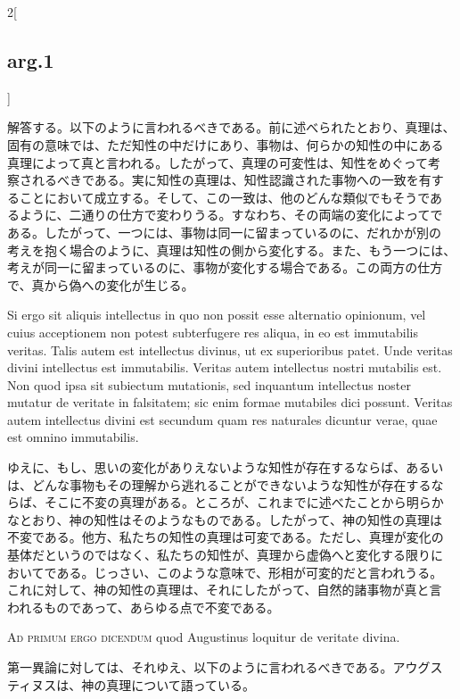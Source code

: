 \documentclass[paper=a4paper,fontsize=10pt,jafontsize=9pt,titlepage]{jlreq}
\begin{document}
\begin{paracol}{2}[\subsection{arg.1}]
\switchcolumn

解答する。以下のように言われるべきである。前に述べられたとおり、真理は、
固有の意味では、ただ知性の中だけにあり、事物は、何らかの知性の中にある
真理によって真と言われる。したがって、真理の可変性は、知性をめぐって考
察されるべきである。実に知性の真理は、知性認識された事物への一致を有す
ることにおいて成立する。そして、この一致は、他のどんな類似でもそうであ
るように、二通りの仕方で変わりうる。すなわち、その両端の変化によってで
ある。したがって、一つには、事物は同一に留まっているのに、だれかが別の
考えを抱く場合のように、真理は知性の側から変化する。また、もう一つには、
考えが同一に留まっているのに、事物が変化する場合である。この両方の仕方
で、真から偽への変化が生じる。

\switchcolumn*


Si ergo sit aliquis intellectus in quo non possit esse alternatio
opinionum, vel cuius acceptionem non potest subterfugere res aliqua,
in eo est immutabilis veritas. Talis autem est intellectus divinus, ut
ex superioribus patet. Unde veritas divini intellectus est
immutabilis. Veritas autem intellectus nostri mutabilis est. Non quod
ipsa sit subiectum mutationis, sed inquantum intellectus noster
mutatur de veritate in falsitatem; sic enim formae mutabiles dici
possunt. Veritas autem intellectus divini est secundum quam res
naturales dicuntur verae, quae est omnino immutabilis.

\switchcolumn

ゆえに、もし、思いの変化がありえないような知性が存在するならば、あるい
は、どんな事物もその理解から逃れることができないような知性が存在するな
らば、そこに不変の真理がある。ところが、これまでに述べたことから明らか
なとおり、神の知性はそのようなものである。したがって、神の知性の真理は
不変である。他方、私たちの知性の真理は可変である。ただし、真理が変化の
基体だというのではなく、私たちの知性が、真理から虚偽へと変化する限りに
おいてである。じっさい、このような意味で、形相が可変的だと言われうる。
これに対して、神の知性の真理は、それにしたがって、自然的諸事物が真と言
われるものであって、あらゆる点で不変である。

\switchcolumn*[\subsection{ad.1}]


{\scshape Ad primum ergo dicendum} quod
Augustinus loquitur de veritate divina.

\switchcolumn

第一異論に対しては、それゆえ、以下のように言われるべきである。アウグス
ティヌスは、神の真理について語っている。


\end{paracol}
\end{document}
